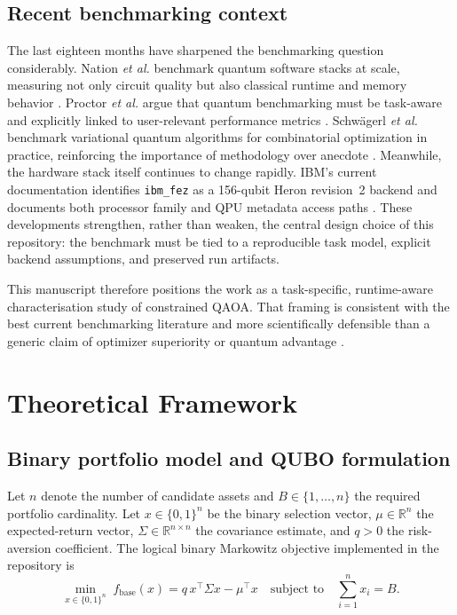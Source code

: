 \documentclass[11pt]{article}
\begin{document}
\subsection{Recent benchmarking context}

The last eighteen months have sharpened the benchmarking question considerably. Nation \emph{et al.} benchmark quantum software stacks at scale, measuring not only circuit quality but also classical runtime and memory behavior \cite{nation2025benchpress}. Proctor \emph{et al.} argue that quantum benchmarking must be task-aware and explicitly linked to user-relevant performance metrics \cite{proctor2025benchmarking}. Schw{\"a}gerl \emph{et al.} benchmark variational quantum algorithms for combinatorial optimization in practice, reinforcing the importance of methodology over anecdote \cite{schwagerl2026benchmarking}. Meanwhile, the hardware stack itself continues to change rapidly. IBM's current documentation identifies \texttt{ibm\_fez} as a 156-qubit Heron revision~2 backend and documents both processor family and QPU metadata access paths \cite{ibm2026qpuinfo,ibm2026processortypes,ibm2026hardware}. These developments strengthen, rather than weaken, the central design choice of this repository: the benchmark must be tied to a reproducible task model, explicit backend assumptions, and preserved run artifacts.

This manuscript therefore positions the work as a task-specific, runtime-aware characterisation study of constrained QAOA. That framing is consistent with the best current benchmarking literature and more scientifically defensible than a generic claim of optimizer superiority or quantum advantage \cite{proctor2025benchmarking,nation2025benchpress,schwagerl2026benchmarking}.

\section{Theoretical Framework}\label{sec:theory}

\subsection{Binary portfolio model and QUBO formulation}

Let \(n\) denote the number of candidate assets and \(B \in \{1,\dots,n\}\) the required portfolio cardinality. Let \(x \in \{0,1\}^n\) be the binary selection vector, \(\mu \in \mathbb{R}^n\) the expected-return vector, \(\Sigma \in \mathbb{R}^{n \times n}\) the covariance estimate, and \(q>0\) the risk-aversion coefficient. The logical binary Markowitz objective implemented in the repository is
\begin{equation}
\min_{x \in \{0,1\}^n} \; f_{\mathrm{base}}(x)
= q\, x^\top \Sigma x - \mu^\top x
\quad \text{subject to} \quad \sum_{i=1}^n x_i = B.
\label{eq:markowitz}
\end{equation}
\end{document}
